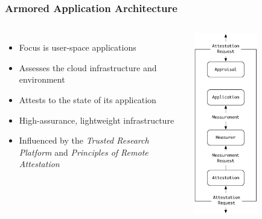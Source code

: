 \documentclass{beamer}
\begin{document}
\begin{frame}
  \frametitle{Armored Application Architecture}
  \begin{columns}[c]
    \begin{itemize}
    \item Focus is user-space applications
    \item Assesses the cloud infrastructure and environment
    \item Attests to the state of its application
    \item High-assurance, lightweight infrastructure
    \item Influenced by the \emph{Trusted Research Platform} and
      \emph{Principles of Remote Attestation}
    \end{itemize}
    \begin{center}
    \includegraphics[width=0.55\textwidth]{figures/architecture.pdf}
    \end{center}
  \end{columns}
\end{frame}
\end{document}
